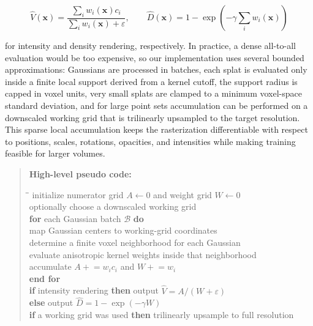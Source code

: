 \documentclass[runningheads]{llncs}
\begin{document}
\begin{equation}
\hat{V}(\mathbf{x}) = \frac{\sum_i w_i(\mathbf{x}) c_i}{\sum_i w_i(\mathbf{x}) + \varepsilon},
\qquad
\hat{D}(\mathbf{x}) = 1 - \exp\left(-\gamma \sum_i w_i(\mathbf{x})\right)
\end{equation}

for intensity and density rendering, respectively. In practice, a dense all-to-all evaluation would be too expensive, so our implementation uses several bounded approximations: Gaussians are processed in batches, each splat is evaluated only inside a finite local support derived from a kernel cutoff, the support radius is capped in voxel units, very small splats are clamped to a minimum voxel-space standard deviation, and for large point sets accumulation can be performed on a downscaled working grid that is trilinearly upsampled to the target resolution. This sparse local accumulation keeps the rasterization differentiable with respect to positions, scales, rotations, opacities, and intensities while making training feasible for larger volumes.

\begin{quote}
\noindent\textbf{High-level pseudo code:}
\begin{tabbing}
\hspace{1.2em}\=\hspace{1.2em}\=\kill
initialize numerator grid $A \leftarrow 0$ and weight grid $W \leftarrow 0$ \\
optionally choose a downscaled working grid \\
\textbf{for} each Gaussian batch $\mathcal{B}$ \textbf{do} \\
\> map Gaussian centers to working-grid coordinates \\
\> determine a finite voxel neighborhood for each Gaussian \\
\> evaluate anisotropic kernel weights inside that neighborhood \\
\> accumulate $A \mathrel{+}= w_i c_i$ and $W \mathrel{+}= w_i$ \\
\textbf{end for} \\
\textbf{if} intensity rendering \textbf{then} output $\hat{V} = A / (W + \varepsilon)$ \\
\textbf{else} output $\hat{D} = 1 - \exp(-\gamma W)$ \\
\textbf{if} a working grid was used \textbf{then} trilinearly upsample to full resolution
\end{tabbing}
\end{quote}
\end{document}
